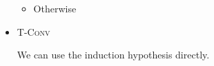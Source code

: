 \documentclass[9pt, a4paper]{extarticle}
\theoremstyle{break}
\newcommand{\rulefbox}[1]{\fbox{\ensuremath{#1}} \hspace{1mm}}
\newcommand{\figheader}[2]{
  \begin{flushleft}
    #2 {\bf \normalsize #1}
\end{flushleft}}
\newcommand{\G}{\Gamma}
\newcommand{\VT}{\vdash\hspace{-.50em}\raisebox{0.28em}{\tiny{$\TB$}}}
\newcommand{\iskind}{\text{\ kind}}
\newcommand{\TW}{\triangleright}
\newcommand{\TB}{\blacktriangleright}
\newcommand{\E}{\equiv}
\newcommand{\WStar}{\textsc{W-Star}}
\newcommand{\WAbs}{\textsc{W-Abs}}
\newcommand{\WCsp}{\textsc{W-Csp}}
\newcommand{\KVar}{\textsc{K-Var}}
\newcommand{\KAbs}{\textsc{K-Abs}}
\newcommand{\KApp}{\textsc{K-App}}
\newcommand{\KTW}{\textsc{K-$\TW$}}
\newcommand{\KGen}{\textsc{K-Gen}}
\newcommand{\KCsp}{\textsc{K-Csp}}
\newcommand{\TVar}{\textsc{T-Var}}
\newcommand{\TConv}{\textsc{T-Conv}}
\begin{document}
\begin{itemize}
\begin{itemize}
        \item Otherwise

    \end{itemize}

    \item \TConv
    
        We can use the induction hypothesis directly.

\end{itemize}



%
% 
% 
\end{document}
